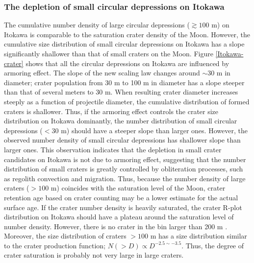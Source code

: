 \documentclass[3p,authoryear]{elsarticle}
\begin{document}
 \subsubsection{The depletion of small circular depressions on Itokawa}
 
The cumulative number density of large circular depressions ($\gtrsim 100$ m) on Itokawa is comparable to the saturation crater density of the Moon. However, the cumulative size distribution of small circular depressions on Itokawa has a slope significantly shallower than that of small craters on the Moon. Figure \ref{Itokawa-crater} shows that all the circular depressions on Itokawa are influenced by armoring effect. The slope of the new scaling law changes around $\sim 30$ m in diameter; crater population from 30 m to 100 m in diameter has a slope steeper than that of several meters to 30 m. When resulting crater diameter increases steeply as a function of projectile diameter, the cumulative distribution of formed craters is shallower.  Thus, if the armoring effect controls the crater size distribution on Itokawa dominantly, the number distribution of small circular depressions ($< 30$ m) should have a steeper slope than larger ones. However, the observed number density of small circular depressions has shallower slope than larger ones. This observation indicates that the depletion in small crater candidates on Itokawa is not due to armoring effect, suggesting that the number distribution of small craters is greatly controlled by obliteration processes, such as regolith convection and migration. Thus, because the number density of large craters ($>100$ m) coincides with the saturation level of the Moon, crater retention age based on crater counting may be a lower estimate for the actual surface age. If the crater number density is heavily saturated, the crater R-plot distribution on Itokawa should have a plateau around the saturation level of number density. However, there is no crater in the bin larger than 200 m \citep{hirata2009}. Moreover, the size distribution of craters $>100$ m has a size distribution similar to the crater production function; $N(>D)\propto D^{-2.5\sim -3.5}$. Thus, the degree of crater saturation is probably not very large in large craters. 

\end{document}

